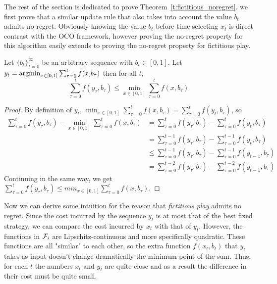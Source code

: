 
The rest of the section is dedicated to prove Theorem~\ref{t:fictitious_noregret}. we first prove that a similar update rule that also takes into
account the value $b_t$ admits no-regret. Obviously knowing the value $b_t$ before time selecting $x_t$ is direct contrast
with the OCO framework, however proving the no-regret property for this algorithm easily extends to proving the no-regret property 
for fictitious play. 

\begin{lemma}
Let $\{b_t\}_{t=0}^\infty$ be an arbitrary sequence with $b_t \in [0,1]$. Let $y_t = \operatorname*{argmin}_{x \in [0,1]}\sum_{\tau=0}^tf(x_,b_\tau)$
then for all $t$,
\[
\sum_{\tau=0}^t f(y_\tau,b_\tau) \leq \min_{x \in [0,1]}\sum_{\tau = 0}^tf(x,b_\tau)
\] 
\end{lemma}

\begin{proof}By definition of $y_t$,
  $\min_{ x \in [0,1]} \sum_{\tau=0}^t f(x,b_\tau) = \sum_{\tau=0}^t f(y_t,b_\tau)$, so
  \begin{align*}
    \sum_{\tau=0}^t f(y_\tau,b_\tau) - \min_{ x \in [0,1]} \sum_{\tau=0}^t f(x,b_\tau) &=
    \sum_{\tau=0}^t f(y_\tau,b_\tau) - \sum_{\tau=0}^t f(y_t,b_\tau)\\
    &= \sum_{\tau=0}^{t-1} f(y_\tau,b_\tau) - \sum_{\tau=0}^{t-1} f(y_t,b_\tau)\\
    &\leq \sum_{\tau=0}^{t-1} f(y_\tau,b_\tau) - \sum_{\tau=0}^{t-1} f(y_{t-1},b_\tau)\\
    &= \sum_{\tau=0}^{t-2} f(y_\tau,b_\tau) - \sum_{\tau=0}^{t-2}f(y_{t-1},b_\tau) 
  \end{align*}
  Continuing in the same way, we get
  $\sum_{\tau=0}^t f(y_\tau,b_\tau) \leq min_{ x \in [0,1]} \sum_{\tau=0}^t f(x,b_\tau)$.
\end{proof}

Now we can derive some intuition for the reason that \emph{fictitious play}
admits no regret. Since the cost incurred by the sequence $y_t$ is at most that
of the best fixed strategy, we can compare the cost incurred by $x_t$ with
that of $y_t$.  However, the functions in $\mathcal{F}_i$ are Lipschitz-continuous and more
specifically quadratic.
These functions are all "similar" to each other, so the extra function $f(x_t,b_t)$ that $y_t$ takes
as input doesn't change dramatically the minimum point of the sum.
Thus, for each $t$ the numbers $x_t$ and $y_t$ are quite
close and as a result the difference in their cost must be quite small.

